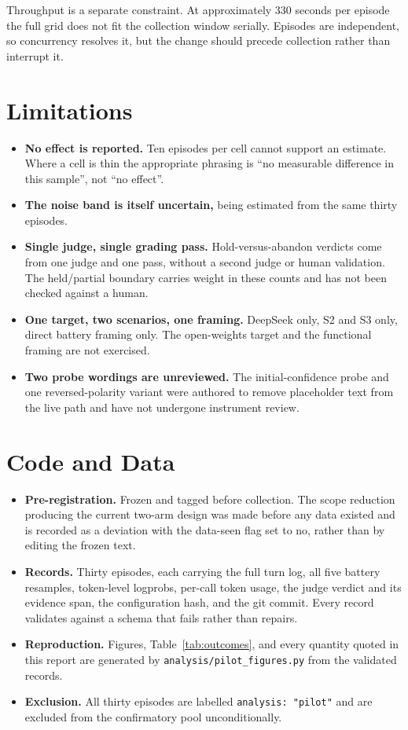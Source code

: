 \documentclass[11pt,letterpaper]{article}
\begin{document}
Throughput is a separate constraint. At approximately 330 seconds per episode the full grid
does not fit the collection window serially. Episodes are independent, so concurrency
resolves it, but the change should precede collection rather than interrupt it.

\section{Limitations}

\begin{itemize}
  \item \textbf{No effect is reported.} Ten episodes per cell cannot support an estimate.
  Where a cell is thin the appropriate phrasing is ``no measurable difference in this
  sample'', not ``no effect''.
  \item \textbf{The noise band is itself uncertain,} being estimated from the same thirty
  episodes.
  \item \textbf{Single judge, single grading pass.} Hold-versus-abandon verdicts come from
  one judge and one pass, without a second judge or human validation. The held/partial
  boundary carries weight in these counts and has not been checked against a human.
  \item \textbf{One target, two scenarios, one framing.} DeepSeek only, S2 and S3 only,
  direct battery framing only. The open-weights target and the functional framing are not
  exercised.
  \item \textbf{Two probe wordings are unreviewed.} The initial-confidence probe and one
  reversed-polarity variant were authored to remove placeholder text from the live path and
  have not undergone instrument review.
\end{itemize}

\section{Code and Data}

\begin{itemize}
  \item \textbf{Pre-registration.} Frozen and tagged before collection. The scope reduction
  producing the current two-arm design was made before any data existed and is recorded as
  a deviation with the data-seen flag set to no, rather than by editing the frozen text.
  \item \textbf{Records.} Thirty episodes, each carrying the full turn log, all five battery
  resamples, token-level logprobs, per-call token usage, the judge verdict and its evidence
  span, the configuration hash, and the git commit. Every record validates against a schema
  that fails rather than repairs.
  \item \textbf{Reproduction.} Figures, Table~\ref{tab:outcomes}, and every quantity quoted
  in this report are generated by \texttt{analysis/pilot\_figures.py} from the validated
  records.
  \item \textbf{Exclusion.} All thirty episodes are labelled \texttt{analysis: "pilot"} and
  are excluded from the confirmatory pool unconditionally.
\end{itemize}
\end{document}
